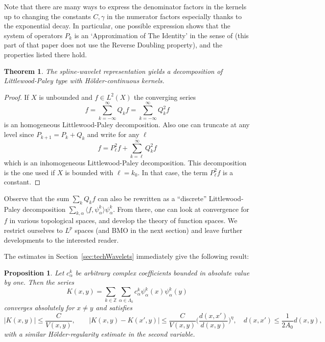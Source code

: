 \documentclass{amsart}
\numberwithin{equation}{section}
\theoremstyle{plain}
\newtheorem{theorem}[equation]{Theorem}
\newtheorem{proposition}[equation]{Proposition}
\theoremstyle{definition}
\theoremstyle{remark}
\begin{document}
{{{Note that there are many ways to express  the denominator factors in the kernels up to changing the constants $C,\gamma$ in the numerator factors especially thanks to the exponential decay. In particular, one possible expression shows that the system of operators $P_{k}$ is an `Approximation of The Identity' in the sense of  \cite[Definition 2.2]{HMY1} (this part of that paper does not use the Reverse Doubling property), and the properties listed there hold. 

 
 \begin{theorem} The spline-wavelet representation  yields a  decomposition of Littlewood-Paley type with H\"older-continuous kernels. 

\end{theorem} 

 
 
 
\begin{proof}
If $X$ is unbounded and $f\in L^2(X)$ the converging series
 $$
 f= \sum_{k=-\infty}^\infty Q_{k}f= \sum_{k=-\infty}^\infty Q_{k}^2f
 $$
 is an homogeneous Littlewood-Paley decomposition.  Also one can truncate at any level  since $P_{k+1}=P_{k}+Q_{k}$ and write for any $\ell$
 $$
 f= P_{\ell}^2f+ \sum_{k=\ell}^\infty Q_{k}^2f
 $$
 which is  an inhomogeneous Littlewood-Paley decomposition. 
 This decomposition is the one used if $X$ is bounded with $\ell=k_{0}$. In that case, the term $P_{\ell}^2f$ is a constant. 
 \end{proof} 
 
Observe that the sum $ \sum_{k} Q_{k}f$ can also be rewritten as a ``discrete'' Littlewood-Paley decomposition $\sum_{k,\alpha} \langle f, \psi^k_{\alpha}\rangle \psi^k_{\alpha}$. 
 From there, one can look at convergence for $f$ in various topological spaces, and develop the theory of function spaces. We restrict ourselves to $L^p$ spaces (and BMO in the next section) and leave further developments to the interested reader. 

The estimates in Section~\ref{sec:techWavelets} immediately give the following result:

\begin{proposition}\label{prop:waveletsToCZO}
Let $c^k_\alpha$ be arbitrary complex coefficients bounded in absolute value by one. Then the series
\begin{equation*}
  K(x,y)=\sum_{k\in{\mathbb{Z}}}\sum_{\alpha\in\Lambda_k} c^k_\alpha\psi^k_\alpha(x)\psi^k_\alpha(y)
\end{equation*}
converges absolutely for $x\neq y$ and satisfies
\begin{equation*}
  {|{K(x,y)}|}\leq\frac{C}{V(x,y)},\qquad
  {|{K(x,y)-K(x',y)}|}\leq\frac{C}{V(x,y)}\Big(\frac{d(x,x')}{d(x,y)}\Big)^{\eta},\quad d(x,x')\leq\frac{1}{2A_{0}}d(x,y),
\end{equation*}
with a similar H\"older-regularity estimate in the second variable.
\end{proposition}

}}}
\end{document}
